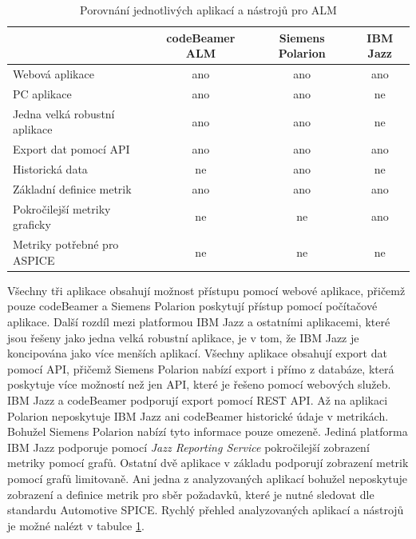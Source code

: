 \documentclass[czech,master]{diploma}
\begin{document}
\begin{table}[htp]
\begin{tabular}{@{}lccc@{}}
\toprule
\textbf{}                     & \textbf{codeBeamer ALM} & \textbf{Siemens Polarion} & \textbf{IBM Jazz} \\ \midrule
Webová aplikace               & ano                     & ano                       & ano               \\
PC aplikace                   & ano                     & ano                       & ne                \\
Jedna velká robustní aplikace & ano                     & ano                       & ne                \\
Export dat pomocí API         & ano                     & ano                       & ano               \\
Historická data               & ne                     & ano                       & ne                \\
Základní definice metrik      & ano                     & ano                       & ano               \\
Pokročilejší metriky graficky & ne                      & ne                        & ano               \\
Metriky potřebné pro ASPICE  & ne                      & ne                        & ne                \\ \bottomrule
\end{tabular}
\caption{Porovnání jednotlivých aplikací a nástrojů pro ALM}
\label{tab:alm_porovnani}
\end{table}

Všechny tři aplikace obsahují možnost přístupu pomocí webové aplikace, přičemž pouze codeBeamer a Siemens Polarion poskytují přístup pomocí počítačové aplikace. Další rozdíl mezi platformou IBM Jazz a ostatními aplikacemi, které jsou řešeny jako jedna velká robustní aplikace, je v tom, že IBM Jazz je koncipována jako více menších aplikací. Všechny aplikace obsahují export dat pomocí API, přičemž Siemens Polarion nabízí export i přímo z databáze, která poskytuje více možností než jen API, které je řešeno pomocí webových služeb. IBM Jazz a codeBeamer podporují export pomocí REST API. Až na aplikaci Polarion neposkytuje IBM Jazz ani codeBeamer historické údaje v metrikách. Bohužel Siemens Polarion nabízí tyto informace pouze omezeně. Jediná platforma IBM Jazz podporuje pomocí \textit{Jazz Reporting Service} pokročilejší zobrazení metriky pomocí grafů. Ostatní dvě aplikace v základu podporují zobrazení metrik pomocí grafů limitovaně. Ani jedna z analyzovaných aplikací bohužel neposkytuje zobrazení a definice metrik pro sběr požadavků, které je nutné sledovat dle standardu Automotive SPICE. Rychlý přehled analyzovaných aplikací a nástrojů je možné nalézt v tabulce \ref{tab:alm_porovnani}.
\end{document}
